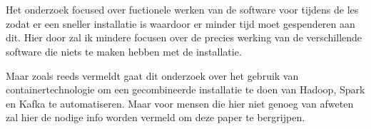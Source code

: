 \chapter{}%
\label{ch:stand-van-zaken}







Het onderzoek focused over fuctionele werken van de software voor tijdens de les zodat er een sneller installatie is waardoor er minder tijd moet gespenderen aan dit. Hier door zal ik mindere focusen over de precies werking van de verschillende software die niets te maken hebben met de installatie.

Maar zoals reeds vermeldt gaat dit onderzoek over het gebruik van containertechnologie om een gecombineerde installatie te doen van Hadoop, Spark en Kafka te automatiseren. Maar voor mensen die hier niet genoeg van afweten zal hier de nodige info worden vermeld om deze paper te bergrijpen.

